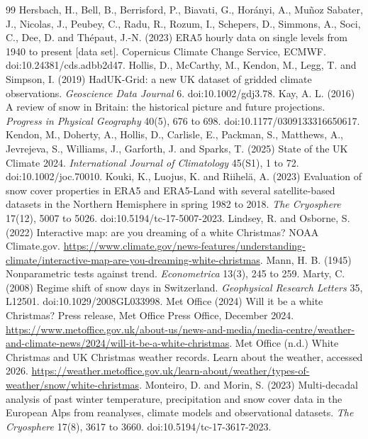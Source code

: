 \documentclass[11pt,a4paper]{article}
\begin{document}
\begin{thebibliography}{99}
 Hersbach, H., Bell, B., Berrisford, P., Biavati, G., Horányi, A., Muñoz Sabater, J., Nicolas, J., Peubey, C., Radu, R., Rozum, I., Schepers, D., Simmons, A., Soci, C., Dee, D. and Thépaut, J.-N. (2023) ERA5 hourly data on single levels from 1940 to present [data set]. Copernicus Climate Change Service, ECMWF. doi:10.24381/cds.adbb2d47.
 Hollis, D., McCarthy, M., Kendon, M., Legg, T. and Simpson, I. (2019) HadUK-Grid: a new UK dataset of gridded climate observations. \textit{Geoscience Data Journal} 6. doi:10.1002/gdj3.78.
 Kay, A. L. (2016) A review of snow in Britain: the historical picture and future projections. \textit{Progress in Physical Geography} 40(5), 676 to 698. doi:10.1177/0309133316650617.
 Kendon, M., Doherty, A., Hollis, D., Carlisle, E., Packman, S., Matthews, A., Jevrejeva, S., Williams, J., Garforth, J. and Sparks, T. (2025) State of the UK Climate 2024. \textit{International Journal of Climatology} 45(S1), 1 to 72. doi:10.1002/joc.70010.
 Kouki, K., Luojus, K. and Riihelä, A. (2023) Evaluation of snow cover properties in ERA5 and ERA5-Land with several satellite-based datasets in the Northern Hemisphere in spring 1982 to 2018. \textit{The Cryosphere} 17(12), 5007 to 5026. doi:10.5194/tc-17-5007-2023.
 Lindsey, R. and Osborne, S. (2022) Interactive map: are you dreaming of a white Christmas? NOAA Climate.gov. \url{https://www.climate.gov/news-features/understanding-climate/interactive-map-are-you-dreaming-white-christmas}.
 Mann, H. B. (1945) Nonparametric tests against trend. \textit{Econometrica} 13(3), 245 to 259.
 Marty, C. (2008) Regime shift of snow days in Switzerland. \textit{Geophysical Research Letters} 35, L12501. doi:10.1029/2008GL033998.
 Met Office (2024) Will it be a white Christmas? Press release, Met Office Press Office, December 2024. \url{https://www.metoffice.gov.uk/about-us/news-and-media/media-centre/weather-and-climate-news/2024/will-it-be-a-white-christmas}.
 Met Office (n.d.) White Christmas and UK Christmas weather records. Learn about the weather, accessed 2026. \url{https://weather.metoffice.gov.uk/learn-about/weather/types-of-weather/snow/white-christmas}.
 Monteiro, D. and Morin, S. (2023) Multi-decadal analysis of past winter temperature, precipitation and snow cover data in the European Alps from reanalyses, climate models and observational datasets. \textit{The Cryosphere} 17(8), 3617 to 3660. doi:10.5194/tc-17-3617-2023.

\end{thebibliography}
\end{document}
